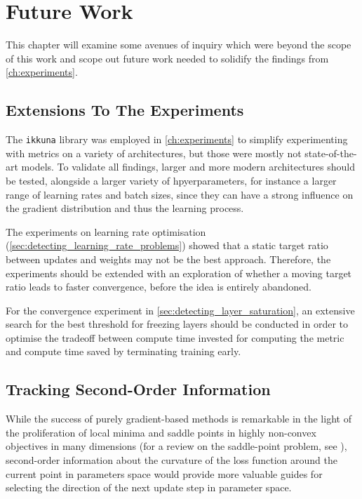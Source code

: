\chapter{Future Work}%
\label{cha:future_work}

This chapter will examine some avenues of inquiry which were beyond the scope of
this work and scope out future work needed to solidify the findings from
\cref{ch:experiments}.

\section{Extensions To The Experiments}

The \texttt{ikkuna} library was employed in \cref{ch:experiments} to simplify
experimenting with metrics on a variety of architectures, but those were mostly
not state-of-the-art models. To validate all findings, larger and more modern
architectures should be tested, alongside a larger variety of hpyerparameters,
for instance a larger range of learning rates and batch sizes, since they can
have a strong influence on the gradient distribution and thus the learning
process.

The experiments on learning rate optimisation
(\cref{sec:detecting_learning_rate_problems}) showed that a static target ratio
between updates and weights may not be the best approach.  Therefore, the
experiments should be extended with an exploration of whether a moving target
ratio leads to faster convergence, before the idea is entirely abandoned.

For the convergence experiment in \cref{sec:detecting_layer_saturation}, an
extensive search for the best threshold for freezing layers should be conducted
in order to optimise the tradeoff between compute time invested for computing
the metric and compute time saved by terminating training early.

\section{Tracking Second-Order Information}%
\label{sec:tracking_second_order_information}

While the success of purely gradient-based methods is remarkable in the
light of the proliferation of local minima and saddle points in highly
non-convex objectives in many dimensions (for a review on the saddle-point problem, see
\citet{dauphin2014identifying}), second-order information about the curvature of
the loss function around the current point in parameters space would provide
more valuable guides for selecting the direction of the next update step in
parameter space.

